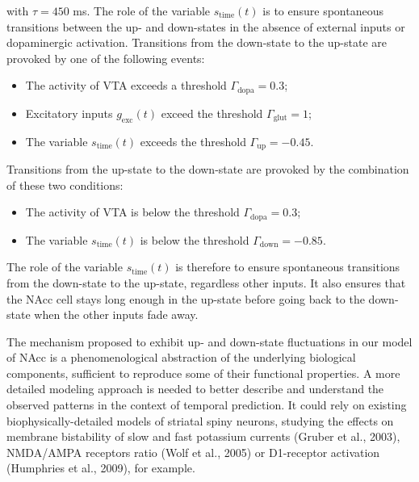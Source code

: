 \documentclass[
  11pt,
  a4paper,
]{scrbook}
\providecommand{\tightlist}{%
  \setlength{\itemsep}{0pt}\setlength{\parskip}{0pt}}\usepackage{longtable,booktabs,array}
\begin{document}
with \(\tau=450\) ms. The role of the variable \(s_{\text{time}}(t)\) is
to ensure spontaneous transitions between the up- and down-states in the
absence of external inputs or dopaminergic activation. Transitions from
the down-state to the up-state are provoked by one of the following
events:

\begin{itemize}
\tightlist
\item
  The activity of VTA exceeds a threshold
  \(\Gamma_{\text{dopa}} = 0.3\);
\item
  Excitatory inputs \(g_{\text{exc}}(t)\) exceed the threshold
  \(\Gamma_{\text{glut}} = 1\);
\item
  The variable \(s_{\text{time}}(t)\) exceeds the threshold
  \(\Gamma_{\text{up}}  = -0.45\).
\end{itemize}

Transitions from the up-state to the down-state are provoked by the
combination of these two conditions:

\begin{itemize}
\tightlist
\item
  The activity of VTA is below the threshold
  \(\Gamma_{\text{dopa}} = 0.3\);
\item
  The variable \(s_{\text{time}}(t)\) is below the threshold
  \(\Gamma_{\text{down}} = -0.85\).
\end{itemize}

The role of the variable \(s_{\text{time}}(t)\) is therefore to ensure
spontaneous transitions from the down-state to the up-state, regardless
other inputs. It also ensures that the NAcc cell stays long enough in
the up-state before going back to the down-state when the other inputs
fade away.

The mechanism proposed to exhibit up- and down-state fluctuations in our
model of NAcc is a phenomenological abstraction of the underlying
biological components, sufficient to reproduce some of their functional
properties. A more detailed modeling approach is needed to better
describe and understand the observed patterns in the context of temporal
prediction. It could rely on existing biophysically-detailed models of
striatal spiny neurons, studying the effects on membrane bistability of
slow and fast potassium currents (Gruber et al., 2003), NMDA/AMPA
receptors ratio (Wolf et al., 2005) or D1-receptor activation (Humphries
et al., 2009), for example.
\end{document}
